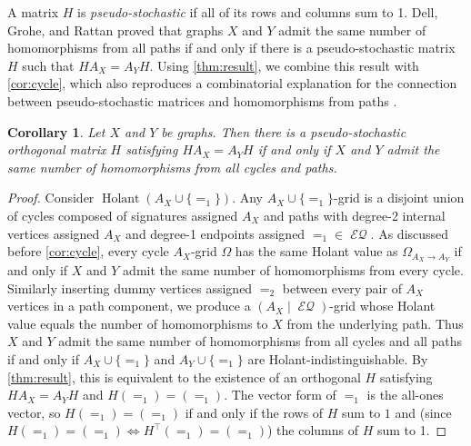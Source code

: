 \documentclass{article}
\newtheorem{corollary}{Corollary}[section]
\theoremstyle{remark}
\theoremstyle{definition}
\DeclareMathOperator{\holant}{Holant}
\DeclareMathOperator{\eq}{\mathcal{EQ}}
\begin{document}
A matrix $H$ is \emph{pseudo-stochastic} if all of its rows and columns sum to 1. Dell, Grohe, and
Rattan \cite{dell} proved that graphs $X$ and $Y$ admit the same number of homomorphisms from all
paths if and only if there is a pseudo-stochastic matrix $H$ such that $HA_X = A_YH$. 
Using \autoref{thm:result}, we combine this result with \autoref{cor:cycle}, which also
reproduces a combinatorial explanation 
for the connection between pseudo-stochastic matrices and homomorphisms from paths 
\cite{grohe_homomorphism_2022}.
\begin{corollary}
    Let $X$ and $Y$ be graphs. Then there is a pseudo-stochastic orthogonal matrix $H$ satisfying 
    $H A_X = A_Y H$
    if and only if $X$ and $Y$ admit the same number of homomorphisms from all cycles and paths.
\end{corollary}
\begin{proof}
    Consider $\holant(A_X \cup \{=_1\})$. Any $A_X\cup \{=_1\}$-grid is a disjoint union of 
    cycles composed of signatures assigned $A_X$ and
    paths with degree-2 internal vertices assigned $A_X$ and degree-1 endpoints
    assigned $=_1 \in \eq$. As discussed before
    \autoref{cor:cycle}, every cycle $A_X$-grid $\Omega$ has the same Holant value as
    $\Omega_{A_X \to A_Y}$ if and only if $X$ and $Y$ admit the same
    number of homomorphisms from every cycle. Similarly inserting dummy vertices assigned $=_2$ between
    every pair of $A_X$ vertices in a path component, we produce
    a $(A_X \mid \eq)$-grid whose Holant value equals the number of homomorphisms to $X$ from the
    underlying path.
    Thus $X$ and $Y$ admit the same number of homomorphisms from all cycles and all paths
    if and only if $A_X \cup \{=_1\}$ and $A_Y \cup \{=_1\}$ are Holant-indistinguishable.
    By \autoref{thm:result}, this is equivalent to the existence of an orthogonal $H$ satisfying 
    $H A_X = A_Y H$ and $H (=_1) = (=_1)$.
    The vector form of $=_1$ is the all-ones vector, so $H (=_1) = (=_1)$ if and only if the rows
    of $H$ sum to $1$ and (since $H(=_1) = (=_1) \iff H^\top(=_1) = (=_1)$) the columns of $H$
    sum to 1.
\end{proof}
\end{document}
